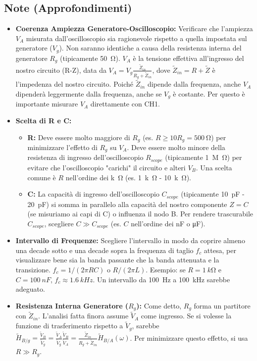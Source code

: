 \documentclass[a4paper, 11pt]{article}
\begin{document}
\subsection{Note (Approfondimenti)}

\begin{itemize}
    \item \textbf{Coerenza Ampiezza Generatore-Oscilloscopio:} Verificare che l'ampiezza $V_A$ misurata dall'oscilloscopio sia ragionevole rispetto a quella impostata sul generatore ($V_g$). Non saranno identiche a causa della resistenza interna del generatore $R_g$ (tipicamente \SI{50}{\ohm}). $V_A$ è la tensione effettiva all'ingresso del nostro circuito (R-Z), data da $V_A = V_g \frac{\tilde{Z}_{in}}{R_g + \tilde{Z}_{in}}$, dove $\tilde{Z}_{in} = R + \tilde{Z}$ è l'impedenza del nostro circuito. Poiché $\tilde{Z}_{in}$ dipende dalla frequenza, anche $V_A$ dipenderà leggermente dalla frequenza, anche se $V_g$ è costante. Per questo è importante misurare $V_A$ direttamente con CH1.
    \item \textbf{Scelta di R e C:}
        \begin{itemize}
            \item \textbf{R:} Deve essere molto maggiore di $R_g$ (es. $R \ge 10 R_g = \SI{500}{\ohm}$) per minimizzare l'effetto di $R_g$ su $V_A$. Deve essere molto minore della resistenza di ingresso dell'oscilloscopio $R_{scope}$ (tipicamente \SI{1}{M\ohm}) per evitare che l'oscilloscopio "carichi" il circuito e alteri $V_B$. Una scelta comune è $R$ nell'ordine dei \si{k\ohm} (es. \SI{1}{k\ohm} - \SI{10}{k\ohm}).
            \item \textbf{C:} La capacità di ingresso dell'oscilloscopio $C_{scope}$ (tipicamente \SI{10}{pF} - \SI{20}{pF}) si somma in parallelo alla capacità del nostro componente $Z=C$ (se misuriamo ai capi di C) o influenza il nodo B. Per rendere trascurabile $C_{scope}$, scegliere $C \gg C_{scope}$ (es. $C$ nell'ordine dei \si{nF} o \si{\micro F}).
        \end{itemize}
    \item \textbf{Intervallo di Frequenze:} Scegliere l'intervallo in modo da coprire almeno una decade sotto e una decade sopra la frequenza di taglio $f_c$ attesa, per visualizzare bene sia la banda passante che la banda attenuata e la transizione. $f_c = 1/(2\pi RC)$ o $R/(2\pi L)$. Esempio: se $R=\SI{1}{k\ohm}$ e $C=\SI{100}{nF}$, $f_c \approx \SI{1.6}{kHz}$. Un intervallo da \SI{100}{Hz} a \SI{100}{kHz} sarebbe adeguato.
    \item \textbf{Resistenza Interna Generatore ($R_g$):} Come detto, $R_g$ forma un partitore con $\tilde{Z}_{in}$. L'analisi fatta finora assume $\tilde{V}_A$ come ingresso. Se si volesse la funzione di trasferimento rispetto a $\tilde{V}_g$, sarebbe $\tilde{H}_{B/g} = \frac{\tilde{V}_B}{\tilde{V}_g} = \frac{\tilde{V}_A}{\tilde{V}_g} \frac{\tilde{V}_B}{\tilde{V}_A} = \frac{\tilde{Z}_{in}}{R_g + \tilde{Z}_{in}} \tilde{H}_{B/A}(\omega)$. Per minimizzare questo effetto, si usa $R \gg R_g$.

\end{itemize}
\end{document}
